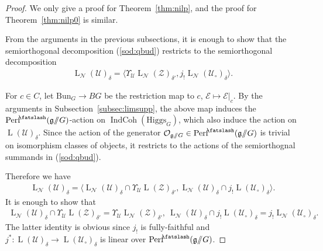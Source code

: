 \documentclass [11pt,oneside,a4paper,mathscr]{amsart}
\theoremstyle{definition}
\newcommand{\LL}{\operatorname{L}}
\newcommand{\fg}{\mathfrak{g}}
\newcommand{\IndCoh}{\operatorname{IndCoh}}
\newcommand{\shear}{{\mathbin{\mkern-6mu\fatslash}}}
\newcommand{\ssslash}{/\!\!/}
\newcommand{\Hig}{\mathrm{Higgs}}
\newcommand{\Bun}{\mathrm{Bun}}
\begin{document}
\begin{proof}
We only give a proof for Theorem~\ref{thm:nilp}, and the proof for Theorem~\ref{thm:nilp0}
is similar. 

 From the arguments in the previous subsections, it is enough to show that
 the semiorthogonal decomposition (\ref{sod:qbud}) restricts to the semiorthogonal decomposition 
 \begin{align*}
     \LL_{\mathcal{N}}(\mathcal{U})_{\delta}=\langle \Upsilon_{\mathcal{U}} \LL_{\mathcal{N}}(\mathcal{Z})_{\delta'}, j_{!}\LL_{\mathcal{N}}(\mathcal{U}_{\circ})_{\delta}\rangle.
 \end{align*}
 
 For $c \in C$, let $\Bun_G \to BG$ be the restriction map to $c$, $\mathcal{E}\mapsto \mathcal{E}|_{c}$. 
 By the arguments in Subsection~\ref{subsec:limsupp}, the above map induces the $\mathrm{Perf}^{\shear}(\fg\ssslash G)$-action 
 on $\IndCoh(\Hig_G)$, which also induce the action on $\LL(\mathcal{U})_{\delta}$. 
 Since the action of the generator $\mathcal{O}_{\fg\ssslash G}\in \mathrm{Perf}^{\shear}(\fg\ssslash G)$ 
 is trivial on isomorphism classes of objects, it restricts to the actions of the semiorthognal summands in (\ref{sod:qbud}). 
 
 Therefore we have 
 \begin{align*}
   \LL_{\mathcal{N}}(\mathcal{U})_{\delta}=\langle  \LL_{\mathcal{N}}(\mathcal{U})_{\delta}\cap\Upsilon_{\mathcal{U}}\LL(\mathcal{Z})_{\delta'},  \LL_{\mathcal{N}}(\mathcal{U})_{\delta}\cap j_{!}\LL(\mathcal{U}_{\circ})_{\delta}\rangle.
   \end{align*}
It is enough to show that 
\begin{align*}
     \LL_{\mathcal{N}}(\mathcal{U})_{\delta}\cap\Upsilon_{\mathcal{U}}\LL(\mathcal{Z})_{\delta'}=\Upsilon_{\mathcal{U}}\LL_{\mathcal{N}}(\mathcal{Z})_{\delta'}, \ \LL_{\mathcal{N}}(\mathcal{U})_{\delta}\cap j_{!}\LL(\mathcal{U}_{\circ})_{\delta}=j_{!}\LL_{\mathcal{N}}(\mathcal{U}_{\circ})_{\delta}.
\end{align*}
 The latter identity is obvious since $j_{!}$ is fully-faithful and 
 $j^*\colon \LL(\mathcal{U})_{\delta} \to \LL(\mathcal{U}_{\circ})_{\delta}$ is linear over  
 $\mathrm{Perf}^{\shear}(\fg\ssslash G)$. 
 

\end{proof}
\end{document}
